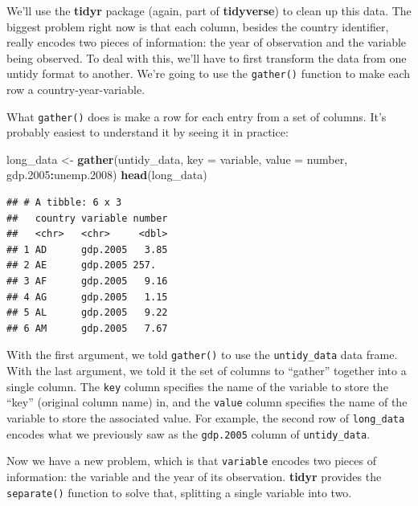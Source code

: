 \documentclass[
  12pt,
  oneside,openany]{book}
\newenvironment{Shaded}{\begin{snugshade}}{\end{snugshade}}
\newcommand{\DataTypeTok}[1]{\textcolor[rgb]{0.13,0.29,0.53}{#1}}
\newcommand{\FloatTok}[1]{\textcolor[rgb]{0.00,0.00,0.81}{#1}}
\newcommand{\KeywordTok}[1]{\textcolor[rgb]{0.13,0.29,0.53}{\textbf{#1}}}
\newcommand{\NormalTok}[1]{#1}
\newcommand{\OperatorTok}[1]{\textcolor[rgb]{0.81,0.36,0.00}{\textbf{#1}}}
\newcommand{\StringTok}[1]{\textcolor[rgb]{0.31,0.60,0.02}{#1}}
\begin{document}
We'll use the \textbf{tidyr} package (again, part of \textbf{tidyverse}) to clean up this data. The biggest problem right now is that each column, besides the country identifier, really encodes two pieces of information: the year of observation and the variable being observed. To deal with this, we'll have to first transform the data from one untidy format to another. We're going to use the \texttt{gather()} function to make each row a country-year-variable.

What \texttt{gather()} does is make a row for each entry from a set of columns. It's probably easiest to understand it by seeing it in practice:

\begin{Shaded}
\begin{Highlighting}[]
\NormalTok{long\_data \textless{}{-}}\StringTok{ }\KeywordTok{gather}\NormalTok{(untidy\_data,}
                    \DataTypeTok{key =}\NormalTok{ variable,}
                    \DataTypeTok{value =}\NormalTok{ number,}
\NormalTok{                    gdp}\FloatTok{.2005}\OperatorTok{:}\NormalTok{unemp}\FloatTok{.2008}\NormalTok{)}
\KeywordTok{head}\NormalTok{(long\_data)}
\end{Highlighting}
\end{Shaded}

\begin{verbatim}
## # A tibble: 6 x 3
##   country variable number
##   <chr>   <chr>     <dbl>
## 1 AD      gdp.2005   3.85
## 2 AE      gdp.2005 257.  
## 3 AF      gdp.2005   9.16
## 4 AG      gdp.2005   1.15
## 5 AL      gdp.2005   9.22
## 6 AM      gdp.2005   7.67
\end{verbatim}

With the first argument, we told \texttt{gather()} to use the \texttt{untidy\_data} data frame. With the last argument, we told it the set of columns to ``gather'' together into a single column. The \texttt{key} column specifies the name of the variable to store the ``key'' (original column name) in, and the \texttt{value} column specifies the name of the variable to store the associated value. For example, the second row of \texttt{long\_data} encodes what we previously saw as the \texttt{gdp.2005} column of \texttt{untidy\_data}.

Now we have a new problem, which is that \texttt{variable} encodes two pieces of information: the variable and the year of its observation. \textbf{tidyr} provides the \texttt{separate()} function to solve that, splitting a single variable into two.
\end{document}

